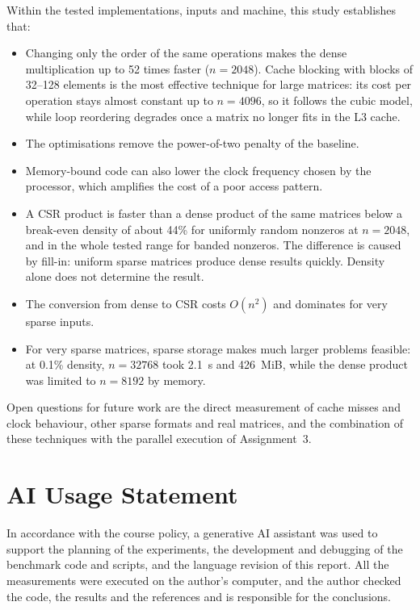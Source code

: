 \documentclass[12pt,a4paper]{report}
\begin{document}
Within the tested implementations, inputs and machine, this study establishes that:
\begin{itemize}
  \item Changing only the order of the same operations makes the dense multiplication up to 52 times faster
  ($n = 2048$). Cache blocking with blocks of 32--128 elements is the most effective technique for large matrices: its
  cost per operation stays almost constant up to $n = 4096$, so it follows the cubic model, while loop reordering
  degrades once a matrix no longer fits in the L3 cache.
  \item The optimisations remove the power-of-two penalty of the baseline.
  \item Memory-bound code can also lower the clock frequency chosen by the processor, which amplifies the cost of a
  poor access pattern.
  \item A CSR product is faster than a dense product of the same matrices below a break-even density of about 44\% for
  uniformly random nonzeros at $n = 2048$, and in the whole tested range for banded nonzeros. The difference is caused
  by fill-in: uniform sparse matrices produce dense results quickly. Density alone does not determine the result.
  \item The conversion from dense to CSR costs $O(n^2)$ and dominates for very sparse inputs.
  \item For very sparse matrices, sparse storage makes much larger problems feasible: at 0.1\% density, $n = 32768$
  took 2.1~s and 426~MiB, while the dense product was limited to $n = 8192$ by memory.
\end{itemize}
Open questions for future work are the direct measurement of cache misses and clock behaviour, other sparse formats and
real matrices, and the combination of these techniques with the parallel execution of Assignment~3.

\chapter*{AI Usage Statement}

In accordance with the course policy, a generative AI assistant was used to support the planning of the experiments,
the development and debugging of the benchmark code and scripts, and the language revision of this report. All the
measurements were executed on the author's computer, and the author checked the code, the results and the references
and is responsible for the conclusions.
\end{document}
